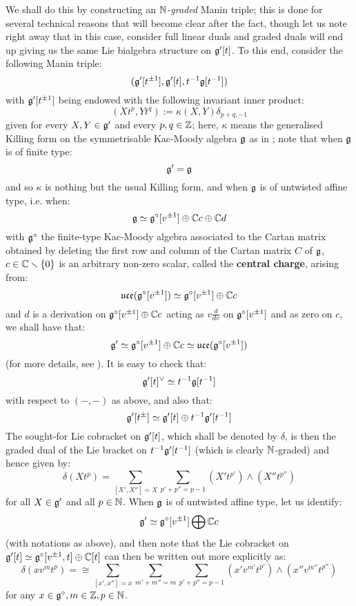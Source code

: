             We shall do this by constructing an \textit{$\mathbb{N}$-graded} Manin triple; this is done for several technical reasons that will become clear after the fact, though let us note right away that in this case, consider full linear duals and graded duals will end up giving us the same Lie bialgebra structure on $\mathfrak{g}'[t]$. To this end, consider the following Manin triple:
                $$(\mathfrak{g}'[t^{\pm 1}], \mathfrak{g}'[t], t^{-1}\mathfrak{g}[t^{-1}])$$
            with $\mathfrak{g}'[t^{\pm 1}]$ being endowed with the following invariant inner product:
                $$(X t^p, Y t^q) := \kappa(X, Y) \delta_{p + q, -1}$$
            given for every $X, Y \in \mathfrak{g}'$ and every $p, q \in \mathbb{Z}$; here, $\kappa$ means the generalised Killing form on the symmetrisable Kac-Moody algebra $\mathfrak{g}$ as in \cite[Chapter 2]{kac_infinite_dimensional_lie_algebras}; note that when $\mathfrak{g}$ is of finite type:
                $$\mathfrak{g}' = \mathfrak{g}$$
            and so $\kappa$ is nothing but the usual Killing form, and when $\mathfrak{g}$ is of untwisted affine type, i.e. when:
                $$\mathfrak{g} \simeq \mathfrak{g}^{\circ}[v^{\pm 1}] \oplus \mathbb{C} c \oplus \mathbb{C} d$$
            with $\mathfrak{g}^{\circ}$ the finite-type Kac-Moody algebra associated to the Cartan matrix obtained by deleting the first row and column of the Cartan matrix $C$ of $\mathfrak{g}$, $c \in \mathbb{C} \smallsetminus \{0\}$ is an arbitrary non-zero scalar, called the \textbf{central charge}, arising from:
                $$\mathfrak{uce}(\mathfrak{g}^{\circ}[v^{\pm 1}]) \simeq \mathfrak{g}^{\circ}[v^{\pm 1}] \oplus \mathbb{C} c$$
            and $d$ is a derivation on $\mathfrak{g}^{\circ}[v^{\pm 1}] \oplus \mathbb{C} c$ acting as $v \frac{d}{dv}$ on $\mathfrak{g}^{\circ}[v^{\pm 1}]$ and as zero on $c$, we shall have that:
                $$\mathfrak{g}' \simeq \mathfrak{g}^{\circ}[v^{\pm 1}] \oplus \mathbb{C} c \simeq \mathfrak{uce}(\mathfrak{g}^{\circ}[v^{\pm 1}])$$
            (for more details, see \cite[Chapter 7]{kac_infinite_dimensional_lie_algebras}). It is easy to check that:
                $$\mathfrak{g}'[t]^{\vee} \simeq t^{-1}\mathfrak{g}[t^{-1}]$$
            with respect to $(-, -)$ as above, and also that:
                $$\mathfrak{g}'[t^{\pm}] \simeq \mathfrak{g}'[t] \oplus t^{-1} \mathfrak{g}'[t^{-1}]$$
            The sought-for Lie cobracket on $\mathfrak{g}'[t]$, which shall be denoted by $\delta$, is then the graded dual of the Lie bracket on $t^{-1}\mathfrak{g}'[t^{-1}]$ (which is clearly $\mathbb{N}$-graded) and hence given by:
                $$\delta(X t^p) = \sum_{[X', X''] = X} \sum_{p' + p'' = p - 1} (X' t^{p'}) \wedge (X'' t^{p''})$$
            for all $X \in \mathfrak{g}'$ and all $p \in \mathbb{N}$. When $\mathfrak{g}$ is of untwisted affine type, let us identify:
                $$\mathfrak{g}' \simeq \mathfrak{g}^{\circ}[v^{\pm 1}] \bigoplus \mathbb{C} c$$
            (with notations as above), and then note that the Lie cobracket on $\mathfrak{g}'[t] \simeq \mathfrak{g}^{\circ}[v^{\pm 1}, t] \oplus \mathbb{C}[t]$ can then be written out more explicitly as:
                $$\delta(x v^m t^p) =\cong \sum_{[x', x''] = x} \sum_{m' + m'' = m} \sum_{p' + p'' = p - 1} (x' v^{m'} t^{p'}) \wedge (x'' v^{m''} t^{p''})$$
            for any $x \in \mathfrak{g}^{\circ}, m \in \mathbb{Z}, p \in \mathbb{N}$.

